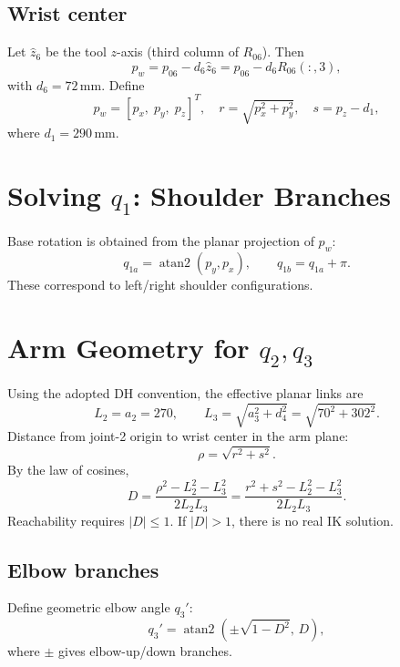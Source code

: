 \documentclass[11pt]{article}
\begin{document}
\subsection*{Wrist center}
Let $\hat z_6$ be the tool $z$-axis (third column of $R_{06}$). Then
\begin{equation}
    p_w = p_{06} - d_6\hat z_6 = p_{06} - d_6R_{06}(:,3),
\end{equation}
with $d_6=72\,\text{mm}$. Define
\begin{equation}
    p_w=[p_x,\;p_y,\;p_z]^T,
    \quad r=\sqrt{p_x^2+p_y^2},
    \quad s=p_z-d_1,
\end{equation}
where $d_1=290\,\text{mm}$.

\section{Solving $q_1$: Shoulder Branches}
Base rotation is obtained from the planar projection of $p_w$:
\begin{equation}
    q_{1a}=\operatorname{atan2}(p_y,p_x),
    \qquad q_{1b}=q_{1a}+\pi.
\end{equation}
These correspond to left/right shoulder configurations.

\section{Arm Geometry for $q_2,q_3$}
Using the adopted DH convention, the effective planar links are
\begin{equation}
    L_2=a_2=270,
    \qquad L_3=\sqrt{a_3^2+d_4^2}=\sqrt{70^2+302^2}.
\end{equation}
Distance from joint-2 origin to wrist center in the arm plane:
\begin{equation}
    \rho=\sqrt{r^2+s^2}.
\end{equation}
By the law of cosines,
\begin{equation}
    D=\frac{\rho^2-L_2^2-L_3^2}{2L_2L_3}
    =\frac{r^2+s^2-L_2^2-L_3^2}{2L_2L_3}.
\end{equation}
Reachability requires $|D|\le1$. If $|D|>1$, there is no real IK solution.

\subsection*{Elbow branches}
Define geometric elbow angle $q_3'$:
\begin{equation}
    q_3' = \operatorname{atan2}(\pm\sqrt{1-D^2},\,D),
\end{equation}
where $\pm$ gives elbow-up/down branches.
\end{document}
